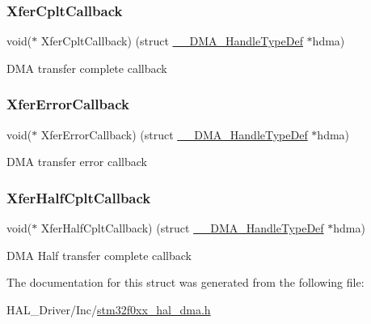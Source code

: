 \subsubsection{\texorpdfstring{Xfer\+Cplt\+Callback}{XferCpltCallback}}
{\footnotesize\ttfamily void($\ast$  Xfer\+Cplt\+Callback) (struct \hyperlink{struct_____d_m_a___handle_type_def}{\+\_\+\+\_\+\+D\+M\+A\+\_\+\+Handle\+Type\+Def} $\ast$hdma)}

D\+MA transfer complete callback \mbox{\label{struct_____d_m_a___handle_type_def_a074ff1d4bf731a9cd85e554f1faec29b}} 
\subsubsection{\texorpdfstring{Xfer\+Error\+Callback}{XferErrorCallback}}
{\footnotesize\ttfamily void($\ast$  Xfer\+Error\+Callback) (struct \hyperlink{struct_____d_m_a___handle_type_def}{\+\_\+\+\_\+\+D\+M\+A\+\_\+\+Handle\+Type\+Def} $\ast$hdma)}

D\+MA transfer error callback \mbox{\label{struct_____d_m_a___handle_type_def_afef2948f0688c22257a540f699e31720}} 
\subsubsection{\texorpdfstring{Xfer\+Half\+Cplt\+Callback}{XferHalfCpltCallback}}
{\footnotesize\ttfamily void($\ast$  Xfer\+Half\+Cplt\+Callback) (struct \hyperlink{struct_____d_m_a___handle_type_def}{\+\_\+\+\_\+\+D\+M\+A\+\_\+\+Handle\+Type\+Def} $\ast$hdma)}

D\+MA Half transfer complete callback 

The documentation for this struct was generated from the following file\+:\begin{DoxyCompactItemize}
\item 
H\+A\+L\+\_\+\+Driver/\+Inc/\hyperlink{stm32f0xx__hal__dma_8h}{stm32f0xx\+\_\+hal\+\_\+dma.\+h}\end{DoxyCompactItemize}
